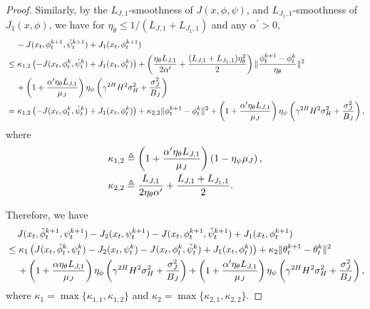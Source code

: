 \documentclass{article}
\theoremstyle{plain}
\theoremstyle{definition}
\theoremstyle{remark}
\def\bydef{\triangleq}
\begin{document}
\begin{proof}
    Similarly, by the $L_{J,1}$-smoothness of $J(x,\phi,\psi)$, and $L_{J_1,1}$-smoothness of $J_1(x,\phi)$, we have for $\eta_\theta \leq 1 / \left( L_{J,1} + L_{J_1,1}\right)$ and any $\alpha^\prime > 0$,
    \begin{align}
        & \quad \, - J(x_t,\phi_t^{k+1},\tilde{\psi}_t^{k+1}) + J_1(x_t,\phi_t^{k+1}) \notag \\
        & \leq \kappa_{1,2} \left( - J(x_t,\phi_t^{k},\tilde{\psi}_t^{k}) + J_1(x_t,\phi_t^{k}) \right) +  \left( \frac{\eta_\theta L_{J,1}}{2\alpha'}  + \frac{(L_{J,1} + L_{J_1,1}) \eta_\theta^2}{2} \right)\| \frac{\phi^{k+1}_t - \phi^{k}_t}{\eta_\theta}\|^2 \notag \\
        & \quad \, +  \left( 1 +\frac{\alpha' \eta_\theta L_{J,1}}{\mu_J} \right)  \eta_\psi \left( \gamma^{2H} H^2 \sigma_H^2 + \frac{\sigma_J^2}{B_{J}} \right) \notag \\
        & = \kappa_{1,2} \left( - J(x_t,\phi_t^{k},\tilde{\psi}_t^{k}) + J_1(x_t,\phi_t^{k}) \right)  + \kappa_{2,2} \| \phi^{k+1}_t - \phi^{k}_t\|^2  + \left( 1 +\frac{\alpha' \eta_\theta L_{J,1}}{\mu_J} \right)  \eta_\psi \left( \gamma^{2H} H^2 \sigma_H^2 + \frac{\sigma_J^2}{B_{J}} \right),
    \end{align}
    where 
    \begin{align}
        \kappa_{1,2} & \bydef \left( 1 +\frac{\alpha' \eta_\theta L_{J,1}}{\mu_J} \right)\left(1 - \eta_\psi \mu_J\right), \notag\\
        \kappa_{2,2} & \bydef \frac{L_{J,1}}{2\eta_\theta\alpha'}  + \frac{L_{J,1} + L_{J_1,1}}{2}. \notag
    \end{align}

    Therefore, we have
    \begin{align}
        & \quad\, J(x_t,\tilde{\phi}_t^{k+1},\psi_t^{k+1}) - J_2(x_t,\psi_t^{k+1}) - J(x_t,\phi_t^{k+1},\tilde{\psi}_t^{k+1}) + J_1(x_t,\phi_t^{k+1}) \notag \\
        & \leq \kappa_{1} \left( J(x_t,\tilde{\phi}_t^{k},\psi_t^{k}) - J_2(x_t,\psi_t^{k}) - J(x_t,\phi_t^{k},\tilde{\psi}_t^{k}) + J_1(x_t,\phi_t^{k}) \right)  + \kappa_{2} \| \theta^{k+1}_t - \theta^{k}_t\|^2 \notag \\
        & \quad \, + \left( 1 +\frac{\alpha \eta_\theta L_{J,1}}{\mu_J} \right) \eta_\phi \left( \gamma^{2H} H^2 \sigma_H^2 + \frac{\sigma_J^2}{B_{J}} \right) + \left( 1 +\frac{\alpha' \eta_\theta L_{J,1}}{\mu_J} \right)  \eta_\psi \left( \gamma^{2H} H^2 \sigma_H^2 + \frac{\sigma_J^2}{B_{J}} \right),
    \end{align}
    where $\kappa_1 = \max\{\kappa_{1,1}, \kappa_{1,2}\}$ and $\kappa_2 = \max\{\kappa_{2,1}, \kappa_{2,2}\}$.


\end{proof}
\end{document}
